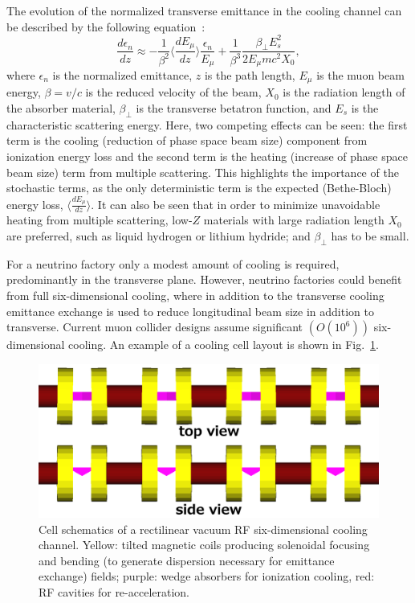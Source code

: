 \documentclass[a4paper,11pt]{article}
\begin{document}
The evolution of the normalized transverse emittance in the cooling channel can be 
described by the following equation~\cite{neuffer}:
\begin{equation}
\frac{d\epsilon_{n}}{dz} \approx -\frac{1}{\beta^{2}}
\langle\frac{dE_{\mu}}{dz}\rangle \frac{\epsilon_{n}}{E_{\mu}}+\frac{1}{\beta^{3}}\frac{\beta_{\perp}E_{s}^{2}}{2E_{\mu}mc^{2}X_{0}},
\label{eq:cooling}
\end{equation}
where $\epsilon_{n}$ is the normalized emittance, $z$ is the path length, $E_{\mu}$ is the muon beam energy, $\beta=v/c$ is the reduced velocity of the beam, $X_{0}$ is the radiation length of the absorber material, $\beta_{\perp}$ is the transverse betatron function, and $E_s$ is the characteristic scattering energy. Here, two competing effects can be seen: the first term is the cooling (reduction of phase space beam size) component from ionization energy loss and the second term is the heating (increase of phase space beam size) term from multiple scattering. This highlights the importance of the stochastic terms, as the only deterministic term is the expected (Bethe-Bloch) energy loss, $\langle\frac{dE_{\mu}}{dz}\rangle$. It can also be seen that in order to minimize unavoidable heating from multiple scattering, low-$Z$ materials with large radiation length $X_0$ are preferred, such as liquid hydrogen or lithium hydride; and $\beta_\perp$ has to be small.
\fi







For a neutrino factory only a modest amount of cooling is required, predominantly in the transverse plane. However, neutrino factories could benefit from full six-dimensional cooling, where in addition to the transverse cooling emittance exchange is used to reduce longitudinal beam size in addition to transverse. Current muon collider designs assume significant $\left(O(10^6)\right)$ six-dimensional cooling. An example of a cooling cell layout is shown in Fig.~\ref{fig:vcc}.

\begin{figure}[htb] 
\centering
\includegraphics[width=\columnwidth]{Figures/vcc}
\caption{Cell schematics of a rectilinear vacuum RF six-dimensional cooling channel. Yellow: tilted magnetic coils producing solenoidal focusing and bending (to generate dispersion necessary for emittance exchange) fields; purple: wedge absorbers for ionization cooling, red: RF cavities for re-acceleration.}
\label{fig:vcc}
\end{figure}
\end{document}
